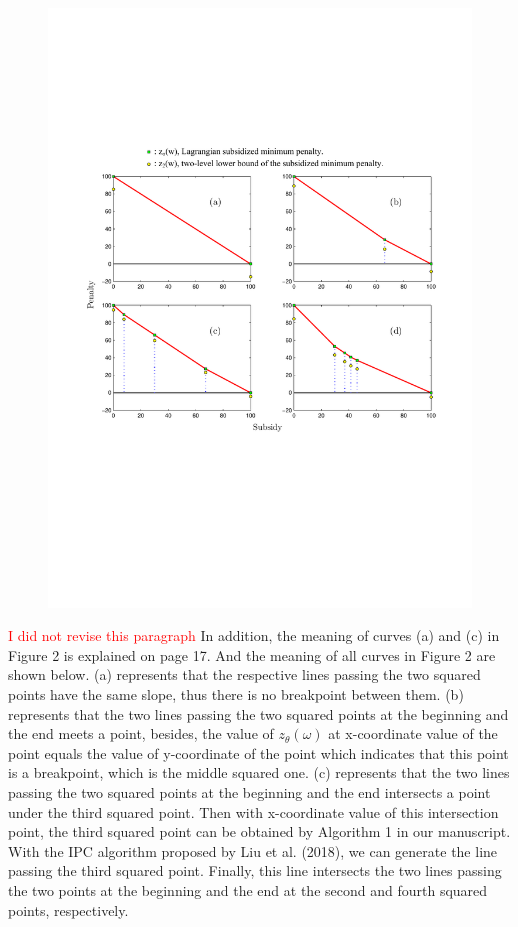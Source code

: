 \documentclass[11pt]{article}
\begin{document}
\begin{figure}[H]
\centering
\includegraphics[width=1\textwidth]{1.pdf}
\centering
\end{figure}
\textcolor{red}{I did not revise this paragraph}
In addition, the meaning of curves (a) and (c) in Figure 2 is explained on page 17.
And the meaning of all curves in Figure 2 are shown below. (a) represents that the respective lines passing the two squared points have the same slope, thus there is no breakpoint between them.
(b) represents that the two lines passing the two squared points at the beginning and the end meets a point, besides, the value of $z_\theta(\omega)$ at x-coordinate value of the point equals the value of y-coordinate of the point which indicates that this point is a breakpoint, which is the middle squared one. (c) represents that the two lines passing the two squared points at the beginning and the end intersects a point under the third squared point. Then with x-coordinate value of this intersection point, the third squared point can be obtained by Algorithm 1 in our manuscript. With the IPC algorithm proposed by Liu et al. (2018), we can generate the line passing the third squared point. Finally, this line intersects the two lines passing the two points at the beginning and the end at the second and fourth squared points, respectively.
\end{document}
